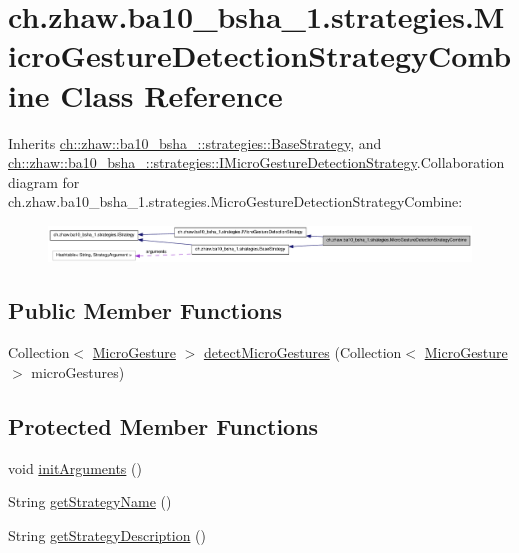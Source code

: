 \hypertarget{classch_1_1zhaw_1_1ba10__bsha__1_1_1strategies_1_1MicroGestureDetectionStrategyCombine}{
\section{ch.zhaw.ba10\_\-bsha\_\-1.strategies.MicroGestureDetectionStrategyCombine Class Reference}
\label{classch_1_1zhaw_1_1ba10__bsha__1_1_1strategies_1_1MicroGestureDetectionStrategyCombine}
}


Inherits \hyperlink{classch_1_1zhaw_1_1ba10__bsha__1_1_1strategies_1_1BaseStrategy}{ch::zhaw::ba10\_\-bsha\_::strategies::BaseStrategy}, and \hyperlink{interfacech_1_1zhaw_1_1ba10__bsha__1_1_1strategies_1_1IMicroGestureDetectionStrategy}{ch::zhaw::ba10\_\-bsha\_::strategies::IMicroGestureDetectionStrategy}.Collaboration diagram for ch.zhaw.ba10\_\-bsha\_\-1.strategies.MicroGestureDetectionStrategyCombine:\nopagebreak
\begin{figure}[H]
\begin{center}
\leavevmode
\includegraphics[width=400pt]{classch_1_1zhaw_1_1ba10__bsha__1_1_1strategies_1_1MicroGestureDetectionStrategyCombine__coll__graph}
\end{center}
\end{figure}
\subsection*{Public Member Functions}
\begin{DoxyCompactItemize}
\item 
Collection$<$ \hyperlink{classch_1_1zhaw_1_1ba10__bsha__1_1_1service_1_1MicroGesture}{MicroGesture} $>$ \hyperlink{classch_1_1zhaw_1_1ba10__bsha__1_1_1strategies_1_1MicroGestureDetectionStrategyCombine_a5487e41dc2d1b6dbe493b5a8420c050f}{detectMicroGestures} (Collection$<$ \hyperlink{classch_1_1zhaw_1_1ba10__bsha__1_1_1service_1_1MicroGesture}{MicroGesture} $>$ microGestures)
\end{DoxyCompactItemize}
\subsection*{Protected Member Functions}
\begin{DoxyCompactItemize}
\item 
void \hyperlink{classch_1_1zhaw_1_1ba10__bsha__1_1_1strategies_1_1MicroGestureDetectionStrategyCombine_ab23cfbf392bc9eb213a0c8768918d9d2}{initArguments} ()
\item 
String \hyperlink{classch_1_1zhaw_1_1ba10__bsha__1_1_1strategies_1_1MicroGestureDetectionStrategyCombine_ad7fdf02bda8daf2d3bd177e23a270f11}{getStrategyName} ()
\item 
String \hyperlink{classch_1_1zhaw_1_1ba10__bsha__1_1_1strategies_1_1MicroGestureDetectionStrategyCombine_adf4547ec5056bf340c60f15ba50330bc}{getStrategyDescription} ()
\end{DoxyCompactItemize}


